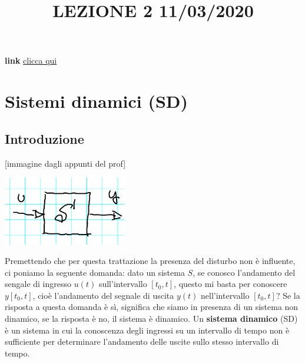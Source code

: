 \newpage
\title{LEZIONE 2 11/03/2020}\newline
\textbf{link} \href{https://web.microsoftstream.com/video/c3fbadab-4a18-4fbd-bd5c-3a50914235b4?list=user&userId=faa91214-a6f5-40d7-8875-253fd49b8ce1}{clicca qui}
\section{Sistemi dinamici (SD)} 
\subsection{Introduzione}
[immagine dagli appunti del prof]
\begin{center}
    \includegraphics[height=3cm]{../lezione2/img1.PNG}
\end{center}
Premettendo che per questa trattazione la presenza del disturbo non è influente, ci poniamo la seguente domanda: dato un sistema $S$, se conosco l'andamento del sengale di ingresso $u(t)$ sull'intervallo $[t_0, t]$, questo mi basta per conoscere $y[t_0,t]$, cioè l'andamento del segnale di uscita $y(t)$ nell'intervallo $[t_0,t]$?\newline
\newline
Se la risposta a questa domanda è sì, significa che siamo in presenza di un sistema non dinamico, se la risposta è no, il sistema è dinamico.\newline
\newline
Un \textbf{sistema dinamico} (SD) è un sistema in cui la conoscenza degli ingressi su un intervallo di tempo non è sufficiente per determinare l'andamento delle uscite sullo stesso intervallo di tempo.

